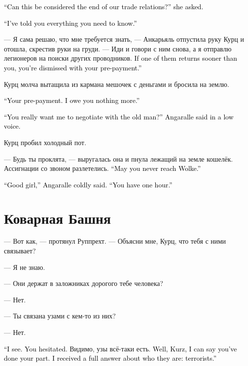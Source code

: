 \documentclass[a4paper,10pt,fleqn]{book}\usepackage{polyglossia}\setdefaultlanguage{english}\setotherlanguage{russian}\defaultfontfeatures{Ligatures=TeX,Mapping=tex-text}\usepackage{xcolor}\definecolor{lightgray}{HTML}{bbbbbb}\color{lightgray}\newcommand{\ml}[3]{\textcolor{black}{#3}}
\begin{document}
\ml{$0$}
{--- Это можно считать окончанием наших торговых отношений? --- осведомилась она.}
{``Can this be considered the end of our trade relations?'' she asked.}

\ml{$0$}
{--- Я тебе сказала всё, что тебе требуется знать.}
{``I've told you everything you need to know.''}

--- Я сама решаю, что мне требуется знать, --- Анкарьяль отпустила руку Курц и отошла, скрестив руки на груди.
--- Иди и говори с ним снова, а я отправлю легионеров на поиски других проводников.
\ml{$0$}
{Если они вернутся раньше тебя --- ты свободна, предоплата у тебя на руках.}
{If one of them returns sooner than you, you're dismissed with your pre-payment.''}

Курц молча вытащила из кармана мешочек с деньгами и бросила на землю.

\ml{$0$}
{--- Твоя предоплата.}
{``Your pre-payment.}
\ml{$0$}
{Больше я тебе ничем не обязана.}
{I owe you nothing more.''}

\ml{$0$}
{--- Ты серьёзно хочешь, чтобы со стариком пошла говорить я? --- Анкарьяль понизила голос.}
{``You really want me to negotiate with the old man?'' Angaralle said in a low voice.}

Курц пробил холодный пот.

--- Будь ты проклята, --- выругалась она и пнула лежащий на земле кошелёк.
Ассигнации со звоном разлетелись.
\ml{$0$}
{--- Надеюсь, ты не достигнешь Вольке.}
{``May you never reach Wolke.''}

\ml{$0$}
{--- Вот и молодец, --- холодно сказала Анкарьяль.}
{``Good girl,'' Angaralle coldly said.}
\ml{$0$}
{--- Даю час.}
{``You have one hour.''}

\section{Коварная Башня}

--- Вот как, --- протянул Руппрехт.
--- Объясни мне, Курц, что тебя с ними связывает?

--- Я не знаю.

--- Они держат в заложниках дорогого тебе человека?

--- Нет.

--- Ты связана узами с кем-то из них?

--- Нет.

\ml{$0$}
{--- Понятно.}
{``I see.}
\ml{$0$}
{Ты заколебалась.}
{You hesitated.}
Видимо, узы всё-таки есть.
\ml{$0$}
{Ну что ж, Курц, можно сказать, что уговор ты выполнила.}
{Well, Kurz, I can say you've done your part.}
\ml{$0$}
{Я получил исчерпывающий ответ, кто они есть --- террористы.}
{I received a full answer about who they are: terrorists.''}
\end{document}
